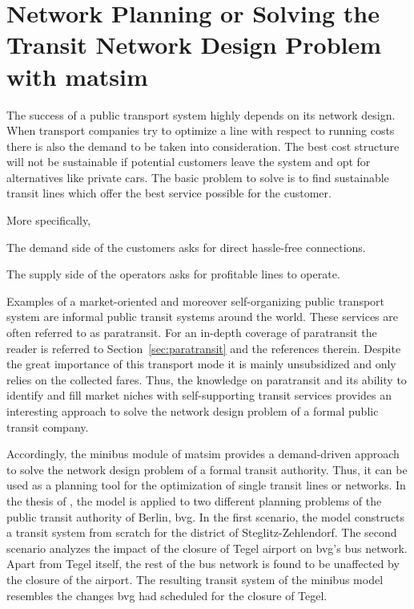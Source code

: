 \section{Network Planning or Solving the Transit Network Design Problem with \protect\gls{matsim}}
\label{sec:paratransit_application}
%
The success of a public transport system highly depends on its network design. When transport companies try to optimize a line with respect to running costs there is also the demand to be taken into consideration. The best cost structure will not be sustainable if potential customers leave the system and opt for alternatives like private cars. The basic problem to solve is to find sustainable transit lines which offer the best service possible for the customer.

More specifically,
\begin{compactitem}
\item The demand side of the customers asks for direct hassle-free connections.
\item The supply side of the operators asks for profitable lines to operate.
\end{compactitem}
Examples of a market-oriented and moreover self-organizing public transport system are informal public transit systems around the world. These services are often referred to as paratransit. For an in-depth coverage of paratransit the reader is referred to Section~\ref{sec:paratransit} and the references therein. Despite the great importance of this transport mode it is mainly unsubsidized and only relies on the collected fares. Thus, the knowledge on paratransit and its ability to identify and fill market niches with self-supporting transit services provides an interesting approach to solve the network design problem of a formal public transit company.

\noindent
Accordingly, the minibus module of \gls{matsim} provides a demand-driven approach to solve the network design problem of a formal transit authority. Thus, it can be used as a planning tool for the optimization of single transit lines or networks. In the thesis of \citet[][]{Neumann_PhDThesis_2014}, the model is applied to two different planning problems of the public transit authority of Berlin, \gls{bvg}. In the first scenario, the model constructs a transit system from scratch for the district of Steglitz-Zehlendorf. The second scenario analyzes the impact of the closure of Tegel airport on \gls{bvg}'s bus network. Apart from Tegel itself, the rest of the bus network is found to be unaffected by the closure of the airport. The resulting transit system of the minibus model resembles the changes \gls{bvg} had scheduled for the closure of Tegel.

